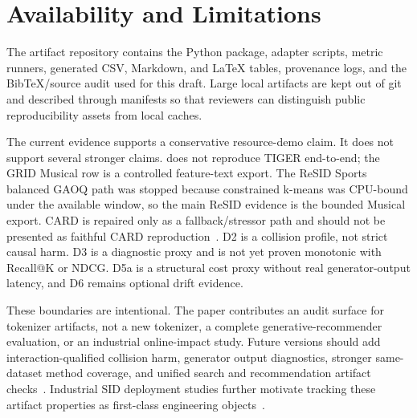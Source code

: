 \section{Availability and Limitations}

The artifact repository contains the \tool Python package, adapter scripts,
metric runners, generated CSV, Markdown, and \LaTeX{} tables, provenance logs,
and
the BibTeX/source audit used for this draft. Large local artifacts are kept out
of git and described through manifests so that reviewers can distinguish
public reproducibility assets from local caches.

The current evidence supports a conservative resource-demo claim. It does not
support several stronger claims. \tool does not reproduce TIGER end-to-end; the
GRID Musical row is a controlled feature-text export. The ReSID Sports balanced
GAOQ path was stopped because constrained k-means was CPU-bound under the
available window, so the main ReSID evidence is the bounded Musical export.
CARD is repaired only as a fallback/stressor path and should not be presented
as faithful CARD reproduction~\cite{wei2026card}. D2 is a collision profile,
not strict causal harm. D3 is a diagnostic proxy and is not yet proven
monotonic with Recall@K or NDCG. D5a is a structural cost proxy without real
generator-output latency, and D6 remains optional drift evidence.

These boundaries are intentional. The paper contributes an audit surface for
tokenizer artifacts, not a new \sid tokenizer, a complete
generative-recommender evaluation, or an industrial online-impact study.
Future versions should add interaction-qualified collision harm, generator
output diagnostics, stronger same-dataset method coverage, and unified search
and recommendation artifact checks~\cite{penha2025jointsid}. Industrial SID
deployment studies further motivate tracking these artifact properties as
first-class engineering objects~\cite{ju2026snapchatsid}.

